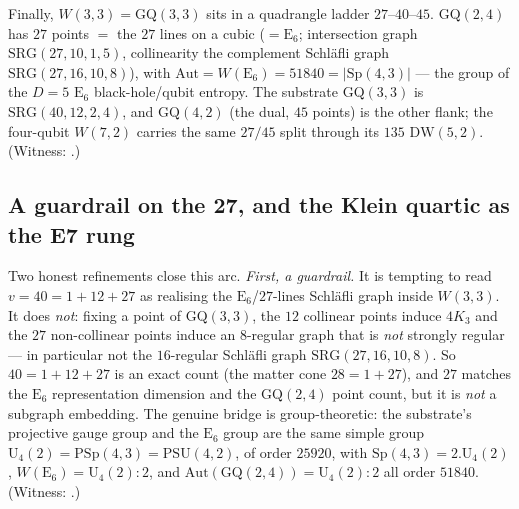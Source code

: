 \documentclass[11pt]{article}
\begin{document}
Finally, $W(3,3)=\mathrm{GQ}(3,3)$ sits in a quadrangle ladder $27$--$40$--$45$.
$\mathrm{GQ}(2,4)$ has $27$ points $=$ the $27$ lines on a cubic ($=\mathrm E_6$;
intersection graph $\mathrm{SRG}(27,10,1,5)$, collinearity the complement
Schl\"afli graph $\mathrm{SRG}(27,16,10,8)$), with
$\mathrm{Aut}=W(\mathrm E_6)=51840=|\mathrm{Sp}(4,3)|$ --- the group of the $D=5$
$\mathrm E_6$ black-hole/qubit entropy. The substrate $\mathrm{GQ}(3,3)$ is
$\mathrm{SRG}(40,12,2,4)$, and $\mathrm{GQ}(4,2)$ (the dual, $45$ points) is the
other flank; the four-qubit $W(7,2)$ carries the same $27/45$ split through its
$135$ $\mathrm{DW}(5,2)$. (Witness:
.)

\subsection{A guardrail on the 27, and the Klein quartic as the E7 rung}

Two honest refinements close this arc. \emph{First, a guardrail.} It is tempting
to read $v=40=1+12+27$ as realising the $\mathrm E_6$/$27$-lines Schl\"afli graph
inside $W(3,3)$. It does \emph{not}: fixing a point of $\mathrm{GQ}(3,3)$, the
$12$ collinear points induce $4K_3$ and the $27$ non-collinear points induce an
$8$-regular graph that is \emph{not} strongly regular --- in particular not the
$16$-regular Schl\"afli graph $\mathrm{SRG}(27,16,10,8)$. So $40=1+12+27$ is an
exact count (the matter cone $28=1+27$), and $27$ matches the $\mathrm E_6$
representation dimension and the $\mathrm{GQ}(2,4)$ point count, but it is
\emph{not} a subgraph embedding. The genuine bridge is group-theoretic: the
substrate's projective gauge group and the $\mathrm E_6$ group are the same
simple group $\mathrm U_4(2)=\mathrm{PSp}(4,3)=\mathrm{PSU}(4,2)$, of order
$25920$, with $\mathrm{Sp}(4,3)=2.\mathrm U_4(2)$, $W(\mathrm E_6)=\mathrm
U_4(2){:}2$, and $\mathrm{Aut}(\mathrm{GQ}(2,4))=\mathrm U_4(2){:}2$ all order
$51840$. (Witness: .)
\end{document}
